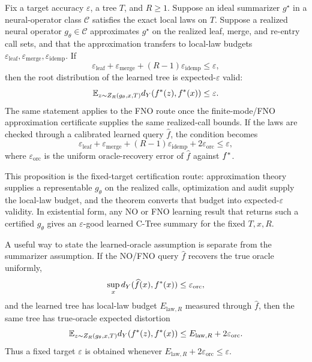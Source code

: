 \begin{proposition}
\label{prop:fixed-epsilon-no-recovery}
Fix a target accuracy \(\varepsilon\), a tree \(T\), and \(R\ge1\).
Suppose an ideal summarizer \(g^\star\) in a neural-operator class
\(\mathcal C\) satisfies the exact local laws on \(T\). Suppose a
realized neural operator \(g_\theta\in\mathcal C\) approximates
\(g^\star\) on the realized leaf, merge, and re-entry call sets, and
that the approximation transfers to local-law budgets
\(\varepsilon_{\mathrm{leaf}},\varepsilon_{\mathrm{merge}},
\varepsilon_{\mathrm{idemp}}\). If
\[
  \varepsilon_{\mathrm{leaf}}
  +\varepsilon_{\mathrm{merge}}
  +(R-1)\varepsilon_{\mathrm{idemp}}
  \le \varepsilon ,
\]
then the root distribution of the learned tree is expected-\(\varepsilon\)
valid:
\[
  \mathbb E_{z\sim Z_R(g_\theta,x,T)}
  d_Y(f^\ast(z),f^\ast(x))
  \le \varepsilon .
\]
The same statement applies to the FNO route once the finite-mode/FNO
approximation certificate supplies the same realized-call bounds. If the
laws are checked through a calibrated learned query \(\widehat f\), the
condition becomes
\[
  \varepsilon_{\mathrm{leaf}}
  +\varepsilon_{\mathrm{merge}}
  +(R-1)\varepsilon_{\mathrm{idemp}}
  +2\varepsilon_{\mathrm{orc}}
  \le \varepsilon ,
\]
where \(\varepsilon_{\mathrm{orc}}\) is the uniform oracle-recovery error of
\(\widehat f\) against \(f^\ast\).
\end{proposition}

This proposition is the fixed-target certification route:
approximation theory supplies a representable \(g_\theta\) on the
realized calls, optimization and audit supply the local-law budget, and
the theorem converts that budget into expected-\(\varepsilon\) validity.
In existential form, any NO or FNO learning result that returns such a
certified \(g_\theta\) gives an \(\varepsilon\)-good learned C-Tree
summary for the fixed \(T,x,R\).

A useful way to state the learned-oracle assumption is separate from the
summarizer assumption. If the NO/FNO query \(\widehat f\) recovers the
true oracle uniformly,
\[
  \sup_x d_Y(\widehat f(x),f^\ast(x)) \le \varepsilon_{\mathrm{orc}},
\]
and the learned tree has local-law budget \(E_{\mathrm{law},R}\) measured
through \(\widehat f\), then the same tree has true-oracle expected
distortion
\[
  \mathbb E_{z\sim Z_R(g_\theta,x,T)}
  d_Y(f^\ast(z),f^\ast(x))
  \le E_{\mathrm{law},R}+2\varepsilon_{\mathrm{orc}}.
\]
Thus a fixed target \(\varepsilon\) is obtained whenever
\(E_{\mathrm{law},R}+2\varepsilon_{\mathrm{orc}}\le\varepsilon\).

